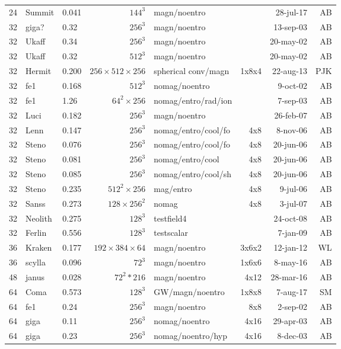 \documentclass[\mydriver,12pt,twoside,notitlepage,a4paper]{article}
\begin{document}
\begin{center}
\begin{footnotesize}
\begin{longtable}{rllrlrrr}
  24 &Summit & 0.041& $144^3$ & magn/noentro &        & 28-jul-17 & AB \\
  32 & giga? & 0.32 & $256^3$ & magn/noentro &        & 13-sep-03 & AB \\
  32 & Ukaff & 0.34 & $256^3$ & magn/noentro &        & 20-may-02 & AB \\
  32 & Ukaff & 0.32 & $512^3$ & magn/noentro &        & 20-may-02 & AB \\
  32 &Hermit&0.200&$256{\!\times\!}512{\!\times\!}256$&spherical conv/magn&1x8x4&22-aug-13&PJK\\
  32 & fe1   & 0.168& $512^3$ &nomag/noentro&        &  9-oct-02 & AB \\
  32 & fe1   & 1.26 & $64^2{\!\times\!}256$ &nomag/entro/rad/ion& & 7-sep-03 & AB \\
  32 & Luci  & 0.182& $256^3$ &magn/noentro &        & 26-feb-07 & AB \\
  32 & Lenn  & 0.147& $256^3$ &nomag/entro/cool/fo& 4x8 &  8-nov-06 & AB \\
  32 & Steno & 0.076& $256^3$ &nomag/entro/cool/fo& 4x8 & 20-jun-06 & AB \\
  32 & Steno & 0.081& $256^3$ &nomag/entro/cool& 4x8 & 20-jun-06 & AB \\
  32 & Steno & 0.085& $256^3$ &nomag/entro/cool/sh& 4x8 & 20-jun-06 & AB \\
  32 & Steno & 0.235& $512^2{\!\times\!}256$ &mag/entro& 4x8 &  9-jul-06 & AB \\
  32 & Sanss & 0.273& $128{\!\times\!}256^2$ &nomag& 4x8 &  3-jul-07 & AB \\
  32 &Neolith& 0.275& $128^3$ &testfield4& &24-oct-08 & AB \\
  32 &Ferlin & 0.556& $128^3$ &testscalar&  &7-jan-09 & AB \\
  36 &Kraken&0.177&$192{\!\times\!}384{\!\times\!}64$&magn/noentro&3x6x2&12-jan-12&WL\\
  36 &scylla &0.096&  $72^3$ & magn/noentro & 1x6x6  &  8-may-16 & AB \\
  48 & janus & 0.028 & $72^2*216$ & magn/noentro &  4x12   &  28-mar-16 & AB \\
  64 &Coma & 0.573 & $128^3$ & GW/magn/noentro & 1x8x8  & 7-aug-17 & SM \\
  64 & fe1   & 0.24 & $256^3$ & magn/noentro &  8x8   &  2-sep-02 & AB \\
  64 & giga  & 0.11 & $256^3$ &nomag/noentro&  4x16  & 29-apr-03 & AB \\
  64 & giga  & 0.23 & $256^3$ &nomag/noentro/hyp&4x16& 8-dec-03& AB \\

\end{longtable}
\end{footnotesize}
\end{center}
\end{document}
